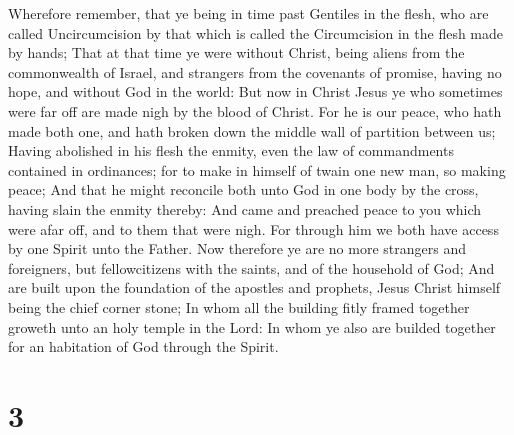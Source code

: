  Wherefore remember, that ye being in time past Gentiles
in the flesh, who are called Uncircumcision by that which is called the
Circumcision in the flesh made by hands;  That at that
time ye were without Christ, being aliens from the commonwealth of
Israel, and strangers from the covenants of promise, having no hope, and
without God in the world:  But now in Christ Jesus ye who
sometimes were far off are made nigh by the blood of Christ.
 For he is our peace, who hath made both one, and hath
broken down the middle wall of partition between us; 
Having abolished in his flesh the enmity, even the law of commandments
contained in ordinances; for to make in himself of twain one new man, so
making peace;  And that he might reconcile both unto God
in one body by the cross, having slain the enmity thereby:
 And came and preached peace to you which were afar off,
and to them that were nigh.  For through him we both have
access by one Spirit unto the Father.  Now therefore ye
are no more strangers and foreigners, but fellowcitizens with the
saints, and of the household of God;  And are built upon
the foundation of the apostles and prophets, Jesus Christ himself being
the chief corner stone;  In whom all the building fitly
framed together groweth unto an holy temple in the Lord: 
In whom ye also are builded together for an habitation of God through
the Spirit.

\hypertarget{section-2}{%
\section{3}\label{section-2}}

